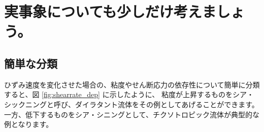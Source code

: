 \documentclass[uplatex,dvipdfmx,a4paper,11pt]{jsarticle}
\begin{document}
\section{実事象についても少しだけ考えましょう。}
\subsection{簡単な分類}

ひずみ速度を変化させた場合の、粘度やせん断応力の依存性について簡単に分類すると、図 \ref{fig:shearrate_dep} に示したように、
粘度が上昇するものをシア・シックニングと呼び、ダイラタント流体をその例としてあげることができます。
一方、低下するものをシア・シニングとして、チクソトロピック流体が典型的な例となります。
\end{document}
